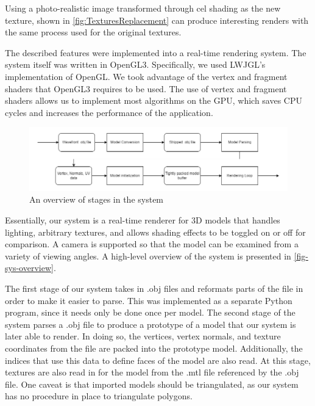 Using a photo-realistic image transformed through cel shading as the new texture, shown in \autoref{fig:TexturesReplacement} can produce interesting 
renders with the same process used for the original textures. 

\newpage 
The described features were implemented into a real-time rendering system. The system itself 
was written in OpenGL3. Specifically, we used LWJGL's implementation of OpenGL. We took advantage
of the vertex and fragment shaders that OpenGL3 requires to be used. The use of vertex and fragment
shaders allows us to implement most algorithms on the GPU, which saves CPU cycles and increases the
performance of the application.

\begin{figure}[h]
    \centering
    \includegraphics[width=\textwidth]{img/system-overview.png}
    \caption{An overview of stages in the system}
    \label{fig-sys-overview}
\end{figure}

Essentially, our system is a real-time renderer for 3D models that handles lighting, arbitrary
textures, and allows shading effects to be toggled on or off for comparison. A camera is supported
so that the model can be examined from a variety of viewing angles. A high-level overview of the
system is presented in \autoref{fig-sys-overview}.

The first stage of our system takes in .obj files and reformats parts of the file in order to make
it easier to parse. This was implemented as a separate Python program, since it needs only be done 
once per model.
The second stage of the system parses a .obj file to produce a prototype of a model that our system
is later able to render. In doing so, the vertices, vertex normals, and texture coordinates from the
file are packed into the prototype model. Additionally, the indices that use this data to define
faces of the model are also read. At this stage, textures are also read in for the model from the
.mtl file referenced by the  .obj file. One caveat is that imported models should be triangulated,
as our system has no procedure in place to triangulate polygons.

